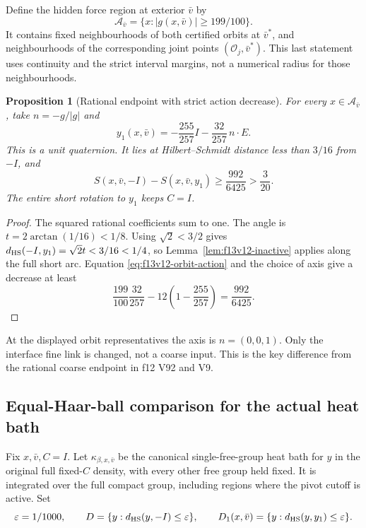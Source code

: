 \documentclass[11pt,oneside]{article}
\newtheorem{proposition}[theorem]{Proposition}
\begin{document}
Define the hidden force region at exterior \(\bar v\)
by
\[
 \mathcal A_{\bar v}
        =\{x:|g(x,\bar v)|\ge199/100\}.
\]
It contains fixed neighbourhoods of both certified
orbits at \(\bar v^*\), and neighbourhoods of the
corresponding joint points \((\mathcal O_j,\bar v^*)\).
This last statement uses continuity and the strict
interval margins, not a numerical radius for those
neighbourhoods.

\begin{proposition}[Rational endpoint with strict action decrease]
\label{prop:f13v12-descent}
For every \(x\in\mathcal A_{\bar v}\), take
\(n=-g/|g|\) and
\[
 y_1(x,\bar v)=-\frac{255}{257}I
                         -\frac{32}{257}\,n\cdot E .
\]
This is a unit quaternion. It lies at
Hilbert--Schmidt distance less than \(3/16\) from
\(-I\), and
\begin{equation}\label{eq:f13v12-descent}
 S(x,\bar v,-I)-S(x,\bar v,y_1)
       \ge\frac{992}{6425}>\frac3{20}.
\end{equation}
The entire short rotation to \(y_1\) keeps \(C=I\).
\end{proposition}

\begin{proof}
The squared rational coefficients sum to one.
The angle is \(t=2\arctan(1/16)<1/8\).
Using \(\sqrt2<3/2\) gives
\(d_{\rm HS}(-I,y_1)=\sqrt2t<3/16<1/4\),
so Lemma~\ref{lem:f13v12-inactive} applies along
the full short arc. Equation
\eqref{eq:f13v12-orbit-action} and the choice of
axis give a decrease at least
\[
 \frac{199}{100}\frac{32}{257}
                   -12\left(1-\frac{255}{257}\right)
        =\frac{992}{6425}.
\]
\end{proof}

At the displayed orbit representatives the axis
is \(n=(0,0,1)\). Only the interface fine link is
changed, not a coarse input. This is the key
difference from the rational coarse endpoint in
f12 V92 and V9.
\subsection{Equal-Haar-ball comparison for the actual heat bath}

Fix \(x,\bar v,C=I\). Let
\(\kappa_{\beta,x,\bar v}\) be the canonical
single-free-group heat bath for \(y\) in the
original full fixed-\(C\) density, with every
other free group held fixed. It is integrated
over the full compact group, including regions
where the pivot cutoff is active.
Set
\[
 \varepsilon=1/1000,\qquad
 D=\{y:d_{\rm HS}(y,-I)\le\varepsilon\},\qquad
 D_1(x,\bar v)=\{y:d_{\rm HS}(y,y_1)\le\varepsilon\}.
\]
\end{document}
